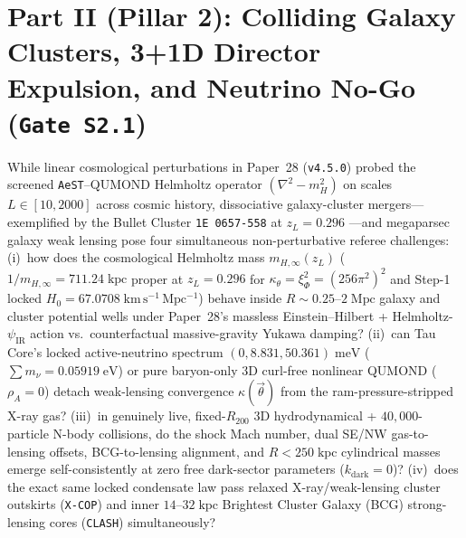 \documentclass[11pt,a4paper]{article}
\begin{document}
\section{Part II (Pillar 2): Colliding Galaxy Clusters, 3+1D Director Expulsion, and Neutrino No-Go (\texttt{Gate S2.1})}
\label{sec:step2-intro}
While linear cosmological perturbations in Paper~28 (\texttt{v4.5.0}) probed the screened \texttt{AeST}--QUMOND Helmholtz operator $(\nabla^2 - m_H^2)$ on scales $L \in [10, 2000]$ across cosmic history, dissociative galaxy-cluster mergers---exemplified by the Bullet Cluster \texttt{1E~0657-558} at $z_L = 0.296$ \cite{Markevitch2004,Clowe2006,Bradac2006,Randall2008,Cha2024}---and megaparsec galaxy weak lensing \cite{Mistele2024} pose four simultaneous non-perturbative referee challenges:
(i)~how does the cosmological Helmholtz mass $m_{H,\infty}(z_L)$ ($1/m_{H,\infty} = 711.24\;\mathrm{kpc}$ proper at $z_L = 0.296$ for $\kappa_\theta = \xi_\Phi^2 = (256\pi^2)^2$ and Step-1 locked $H_0 = 67.0708\;\mathrm{km\,s^{-1}\,Mpc^{-1}}$) behave inside $R \sim 0.25\text{--}2\;\mathrm{Mpc}$ galaxy and cluster potential wells under Paper~28's massless Einstein--Hilbert + Helmholtz-$\psi_{\mathrm{IR}}$ action vs.\ counterfactual massive-gravity Yukawa damping?
(ii)~can Tau Core's locked active-neutrino spectrum $(0, 8.831, 50.361)\;\mathrm{meV}$ ($\sum m_\nu = 0.05919\;\mathrm{eV}$) or pure baryon-only 3D curl-free nonlinear QUMOND ($\rho_A = 0$) detach weak-lensing convergence $\kappa(\vec{\theta})$ from the ram-pressure-stripped X-ray gas?
(iii)~in genuinely live, fixed-$R_{200}$ 3D hydrodynamical + $40{,}000$-particle N-body collisions, do the shock Mach number, dual SE/NW gas-to-lensing offsets, BCG-to-lensing alignment, and $R < 250\;\mathrm{kpc}$ cylindrical masses emerge self-consistently at zero free dark-sector parameters ($k_{\mathrm{dark}} = 0$)?
(iv)~does the exact same locked condensate law pass relaxed X-ray/weak-lensing cluster outskirts (\texttt{X-COP}) and inner $14\text{--}32\;\mathrm{kpc}$ Brightest Cluster Galaxy (BCG) strong-lensing cores (\texttt{CLASH}) simultaneously?
\end{document}
